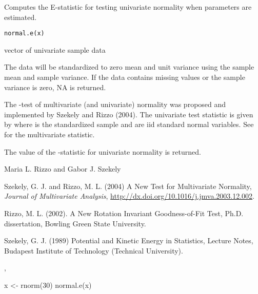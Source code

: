 \begin{Description}\relax
Computes the E-statistic for testing univariate normality 
when parameters are estimated.
\end{Description}
\begin{Usage}
\begin{verbatim}
normal.e(x)
\end{verbatim}
\end{Usage}
\begin{Arguments}
\begin{ldescription}
\item[\code{x}] vector of univariate sample data
\end{ldescription}
\end{Arguments}
\begin{Details}\relax
The
data will be standardized to zero mean and unit variance
using the sample mean and sample variance. If the data contains
missing values or the sample variance is zero, NA is
returned.

The 
-test of multivariate (and univariate)
normality was proposed and implemented by Szekely and Rizzo 
(2004). The univariate test statistic
is given by
where  is the standardized sample and
 are iid standard normal variables. See 
 for the multivariate statistic.\end{Details}
\begin{Value}
The value of the -statistic for univariate
normality is returned.\end{Value}
\begin{Author}\relax
Maria L. Rizzo  and
Gabor J. Szekely 
\end{Author}
\begin{References}\relax
Szekely, G. J. and Rizzo, M. L. (2004) A New Test for 
Multivariate Normality, \emph{Journal of Multivariate Analysis},
\url{http://dx.doi.org/10.1016/j.jmva.2003.12.002}.

Rizzo, M. L. (2002). A New Rotation Invariant Goodness-of-Fit Test,
Ph.D. dissertation, Bowling Green State University.

Szekely, G. J. (1989) Potential and Kinetic Energy in Statistics, 
Lecture Notes, Budapest Institute of Technology (Technical University).\end{References}
\begin{SeeAlso}\relax
{}, 
\end{SeeAlso}
\begin{Examples}
\begin{ExampleCode}
 x <- rnorm(30)
 normal.e(x)
\end{ExampleCode}
\end{Examples}

